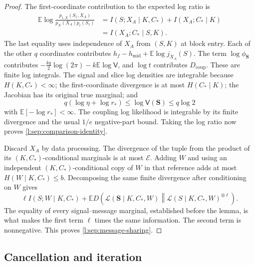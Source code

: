 \begin{proof}
The first-coordinate contribution to the expected log ratio is
\begin{align*}
 \mathbb E\log\frac{p_{1,X}(S_1,X_A)}
                         {p_X(X_A)p_c(S_1)}
 &=I(S;X_A\mid K,C_*)+I(X_A;C_*\mid K)\\
 &=I(X_A;C_*\mid S,K).
\end{align*}
The last equality uses independence of \(X_A\) from \((S,K)\) at
block entry.  Each of the other \(q\) coordinates contributes
\(h_f-h_{\mathrm{mid}}+\mathbb E\log j_{X_A}(S)\).
The term \(\log\phi_{\mathbf S}\) contributes
\(-\tfrac{kq}{2}\log(2\pi)-k\mathbb E\log\mathsf V\), and
\(\log t\) contributes \(D_{\mathrm{coup}}\).
These are finite log integrals.  The signal and slice log densities
are integrable because \(H(K,C_*)<\infty\); the first-coordinate
divergence is at most \(H(C_*\mid K)\); the Jacobian has its original
true marginal; and
\[
 q(\log\eta+\log r_*)\le\log\mathsf V(\mathbf S)\le q\log2
\]
with \(\mathbb E[-\log r_*]<\infty\).  The coupling log likelihood
is integrable by its finite divergence and the usual \(1/e\)
negative-part bound.  Taking the log ratio now proves
\eqref{l:sep:comparison-identity}.

Discard \(X_A\) by data processing.  The divergence of the tuple
from the product of its \((K,C_*)\)-conditional marginals is at
most \(\mathcal E\).  Adding \(W\) and using an independent
\((K,C_*)\)-conditional copy of \(W\) in that reference adds at
most \(H(W\mid K,C_*)\le b\).  Decomposing the same finite
divergence after conditioning on \(W\) gives
\[
 \ell I(S;W\mid K,C_*)+
 \mathbb E D\!\left(
    \mathcal L(\mathbf S\mid K,C_*,W)
    \middle\|
    \mathcal L(S\mid K,C_*,W)^{\otimes\ell}\right).
\]
The equality of every signal--message marginal, established before
the lemma, is what makes the first term \(\ell\) times the same
information.  The second term is nonnegative.  This proves
\eqref{l:sep:message-sharing}.
\end{proof}

\subsection{Cancellation and iteration}

